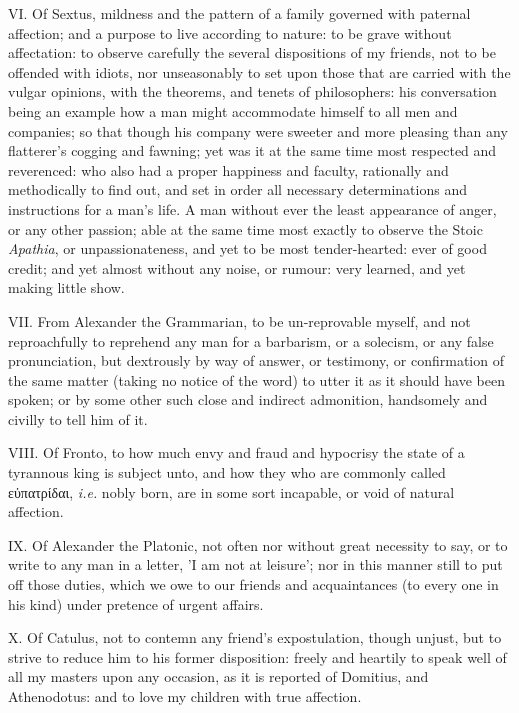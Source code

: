 VI. Of Sextus, mildness and the pattern of a family governed with
paternal affection; and a purpose to live according to nature: to be grave
without affectation: to observe carefully the several dispositions of my
friends, not to be offended with idiots, nor unseasonably to set upon
those that are carried with the vulgar opinions, with the theorems, and
tenets of philosophers: his conversation being an example how a man might
accommodate himself to all men and companies; so that though his company
were sweeter and more pleasing than any flatterer's cogging and fawning;
yet was it at the same time most respected and reverenced: who also had a
proper happiness and faculty, rationally and methodically to find out, and
set in order all necessary determinations and instructions for a man's
life. A man without ever the least appearance of anger, or any other
passion; able at the same time most exactly to observe the Stoic \emph{Apathia},
or unpassionateness, and yet to be most tender-hearted: ever of good
credit; and yet almost without any noise, or rumour: very learned, and yet
making little show.

VII. From Alexander the Grammarian, to be un-reprovable myself, and not
reproachfully to reprehend any man for a barbarism, or a solecism, or any
false pronunciation, but dextrously by way of answer, or testimony, or
confirmation of the same matter (taking no notice of the word) to utter it
as it should have been spoken; or by some other such close and indirect
admonition, handsomely and civilly to tell him of it.

VIII. Of Fronto, to how much envy and fraud and hypocrisy the state of a
tyrannous king is subject unto, and how they who are commonly called
εὐπατρίδαι,
\emph{i.e.} nobly born, are in some sort incapable, or void of natural
affection.

IX. Of Alexander the Platonic, not often nor without great necessity to
say, or to write to any man in a letter, 'I am not at leisure'; nor in
this manner still to put off those duties, which we owe to our friends and
acquaintances (to every one in his kind) under pretence of urgent affairs.

X. Of Catulus, not to contemn any friend's expostulation, though unjust,
but to strive to reduce him to his former disposition: freely and heartily
to speak well of all my masters upon any occasion, as it is reported of
Domitius, and Athenodotus: and to love my children with true affection.

